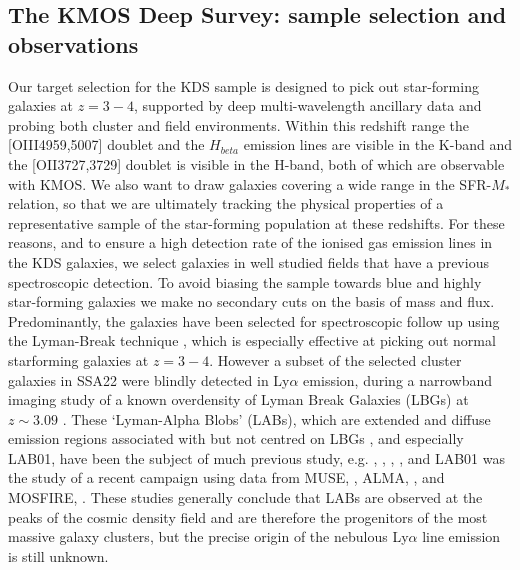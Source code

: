 \documentclass[a4paper,fleqn,usenatbib]{mn2e}
\begin{document}

\subsection{The KMOS Deep Survey: sample selection and observations}
Our target selection for the KDS sample is designed to pick out star-forming galaxies at $z = 3-4$, supported by deep multi-wavelength ancillary data and probing both cluster and field environments.
Within this redshift range the [OIII4959,5007] doublet and the $H_{beta}$ emission lines are visible in the K-band and the [OII3727,3729] doublet is visible in the H-band, both of which are observable with KMOS. 
We also want to draw galaxies covering a wide range in the SFR-$M_{*}$ relation, so that we are ultimately tracking the physical properties of a representative sample of the star-forming population at these redshifts.
For these reasons, and to ensure a high detection rate of the ionised gas emission lines in the KDS galaxies, we select galaxies in well studied fields that have a previous spectroscopic detection.
To avoid biasing the sample towards blue and highly star-forming galaxies we make no secondary cuts on the basis of mass and flux. %
Predominantly, the galaxies have been selected for spectroscopic follow up using the Lyman-Break technique \citep{Steidel1996}, which is especially effective at picking out normal starforming galaxies at $z = 3-4$.
However a subset of the selected cluster galaxies in SSA22 were blindly detected in Ly$\alpha$ emission, during a narrowband imaging study of a known overdensity of Lyman Break Galaxies (LBGs) at $z \sim 3.09$ \citep{Steidel2000}.
These `Lyman-Alpha Blobs' (LABs), which are extended and diffuse emission regions associated with but not centred on LBGs \citep{Steidel2000}, and especially LAB01, have been the subject of much previous study, e.g. \citep{Bower2004a}, \citep{Matsuda2004,Matsuda2007}, \citep{Geach2006,Geach2014}, \citep{Weijmans2010}, \citep{Hayes2011a} and LAB01 was the study of a recent campaign \citep{Geach2016} using data from MUSE, \citep{Bacon2010}, ALMA, \citep{Wootten2009}, and MOSFIRE, \citep{McLean2012}.
These studies generally conclude that LABs are observed at the peaks of the cosmic density field and are therefore the progenitors of the most massive galaxy clusters, but the precise origin of the nebulous Ly$\alpha$ line emission is still unknown.
\end{document}
